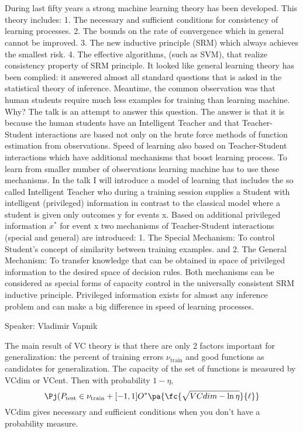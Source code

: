 \section{}
During last fifty years a strong machine learning theory has been developed. This theory includes: 1. The necessary and sufficient conditions for consistency of learning processes. 2. The bounds on the rate of convergence which in general cannot be improved. 3. The new inductive principle (SRM) which always achieves the smallest risk. 4. The effective algorithms, (such as SVM), that realize consistency property of SRM principle. It looked like general learning theory has been complied: it answered almost all standard questions that is asked in the statistical theory of inference. Meantime, the common observation was that human students require much less examples for training than learning machine. Why? The talk is an attempt to answer this question. The answer is that it is because the human students have an Intelligent Teacher and that Teacher-Student interactions are based not only on the brute force methods of function estimation from observations. Speed of learning also based on Teacher-Student interactions which have additional mechanisms that boost learning process. To learn from smaller number of observations learning machine has to use these mechanisms. In the talk I will introduce a model of learning that includes the so called Intelligent Teacher who during a training session supplies a Student with intelligent (privileged) information in contrast to the classical model where a student is given only outcomes y for events x. Based on additional privileged information $x^*$ for event x two mechanisms of Teacher-Student interactions (special and general) are introduced: 1. The Special Mechanism: To control Student's concept of similarity between training examples. and 2. The General Mechanism: To transfer knowledge that can be obtained in space of privileged information to the desired space of decision rules. Both mechanisms can be considered as special forms of capacity control in the universally consistent SRM inductive principle. Privileged information exists for almost any inference problem and can make a big difference in speed of learning processes.

Speaker: Vladimir Vapnik

The main result of VC theory is that there are only 2 factors important for generalization: the percent of training errors $\nu_{\text{train}}$ and good functions as candidates for generalization. The capacity of the set of functions is measured by VCdim or VCent. Then with probability $1-\eta$,
\[
\Pj(P_{\text{test}}\in \nu_{\text{train}}+[-1,1]O^*\pa{\fc{\sqrt{VCdim-\ln \eta}}{\ell}}
\]
VCdim gives necessary and sufficient conditions when you don't have a probability measure.

